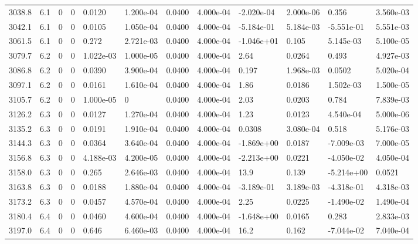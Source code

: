 \documentclass[preview]{standalone}
\begin{document}
{{{{{{{{\begin{tabular}{L{1.2cm}C{1.2cm} C{0.3cm}C{0.5cm} C{1.4cm}C{1.4cm} C{1.4cm}C{1.4cm} C{1.6cm}C{1.6cm} C{1.6cm}C{1.6cm}}
  3038.8  &   6.1  & 0     &  0 &  0.0120  & 1.200e-04  &  0.0400&   4.000e-04& -2.020e-04 & 2.000e-06   &  0.356 & 3.560e-03  \\ 
  3042.1  &   6.1  & 0     &  0 &  0.0105  & 1.050e-04  &  0.0400&   4.000e-04& -5.184e-01 & 5.184e-03   &  -5.551e-01 & 5.551e-03  \\ 
  3061.5  &   6.1  & 0     &  0 &  0.272  & 2.721e-03  &  0.0400&   4.000e-04& -1.046e+01 & 0.105   &  5.145e-03 & 5.100e-05  \\ 
  3079.7  &   6.2  & 0     &  0 &  1.022e-03  & 1.000e-05  &  0.0400&   4.000e-04& 2.64 & 0.0264   &  0.493 & 4.927e-03  \\ 
  3086.8  &   6.2  & 0     &  0 &  0.0390  & 3.900e-04  &  0.0400&   4.000e-04& 0.197 & 1.968e-03   &  0.0502 & 5.020e-04  \\ 
  3097.1  &   6.2  & 0     &  0 &  0.0161  & 1.610e-04  &  0.0400&   4.000e-04& 1.86 & 0.0186   &  1.502e-03 & 1.500e-05  \\ 
  3105.7  &   6.2  & 0     &  0 &  1.000e-05  & 0  &  0.0400&   4.000e-04& 2.03 & 0.0203   &  0.784 & 7.839e-03  \\ 
  3126.2  &   6.3  & 0     &  0 &  0.0127  & 1.270e-04  &  0.0400&   4.000e-04& 1.23 & 0.0123   &  4.540e-04 & 5.000e-06  \\ 
  3135.2  &   6.3  & 0     &  0 &  0.0191  & 1.910e-04  &  0.0400&   4.000e-04& 0.0308 & 3.080e-04   &  0.518 & 5.176e-03  \\ 
  3144.3  &   6.3  & 0     &  0 &  0.0364  & 3.640e-04  &  0.0400&   4.000e-04& -1.869e+00 & 0.0187   &  -7.009e-03 & 7.000e-05  \\ 
  3156.8  &   6.3  & 0     &  0 &  4.188e-03  & 4.200e-05  &  0.0400&   4.000e-04& -2.213e+00 & 0.0221   &  -4.050e-02 & 4.050e-04  \\ 
  3158.0  &   6.3  & 0     &  0 &  0.265  & 2.646e-03  &  0.0400&   4.000e-04& 13.9 & 0.139   &  -5.214e+00 & 0.0521  \\ 
  3163.8  &   6.3  & 0     &  0 &  0.0188  & 1.880e-04  &  0.0400&   4.000e-04& -3.189e-01 & 3.189e-03   &  -4.318e-01 & 4.318e-03  \\ 
  3173.2  &   6.3  & 0     &  0 &  0.0457  & 4.570e-04  &  0.0400&   4.000e-04& 2.25 & 0.0225   &  -1.490e-02 & 1.490e-04  \\ 
  3180.4  &   6.4  & 0     &  0 &  0.0460  & 4.600e-04  &  0.0400&   4.000e-04& -1.648e+00 & 0.0165   &  0.283 & 2.833e-03  \\ 
  3197.0  &   6.4  & 0     &  0 &  0.646  & 6.460e-03  &  0.0400&   4.000e-04& 16.2 & 0.162   &  -7.044e-02 & 7.040e-04  \\ 

\end{tabular}}}}}}}}}
\end{document}

